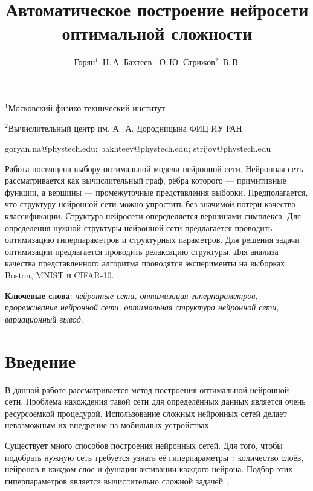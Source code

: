 \documentclass[12pt,twoside]{article}
\begin{document}
\title
    {Автоматическое построение нейросети оптимальной сложности}
\author
    {Горян$^1$~Н.\,А. Бахтеев$^1$~О.\,Ю.  Стрижов$^2$~В.\,В.} %

\organization
    {$^1$Московский физико-технический институт\par
    $^2$Вычислительный центр им. А.~А. Дородницына ФИЦ ИУ РАН}

\email
    {goryan.na@phystech.edu; bakhteev@phystech.edu; strijov@phystech.edu}    


    

\abstract
	{Работа посвящена выбору оптимальной модели нейронной сети. Нейронная сеть рассматривается как вычислительный граф, рёбра которого --- примитивные функции, а вершины --- промежуточные представления выборки. Предполагается, что структуру нейронной сети можно упростить без значимой потери качества классификации. Структура нейросети опеределяется вершинами симплекса. Для определения нужной структуры нейронной сети предлагается проводить оптимизацию гиперпараметров и структурных параметров. Для решения задачи оптимизации предлагается проводить релаксацию структуры. Для анализа качества представленного алгоритма проводятся эксперименты на выборках Boston, MNIST и CIFAR-10.
\bigskip

\textbf{Ключевые слова}: \emph {нейронные сети, оптимизация гиперпараметров, прореживание нейронной сети, оптимальная структура нейронной сети, вариационный вывод}.
}


\maketitle


\section{ Введение}
	
	В данной работе рассматривается метод построения оптимальной нейронной сети. Проблема нахождения такой сети для определённых данных является очень ресурсоёмкой процедурой. Использование сложных нейронных сетей делает невозможным их внедрение на мобильных устройствах.
	
	Существует много способов построения нейронных сетей. Для того, чтобы подобрать нужную сеть требуется узнать её гиперпараметры~\cite{Myung1997}: количество слоёв, нейронов в каждом слое и функции активации каждого нейрона. Подбор этих гиперпараметров является вычислительно сложной задачей~\cite{sutskever2014}.
	
\end{document}
